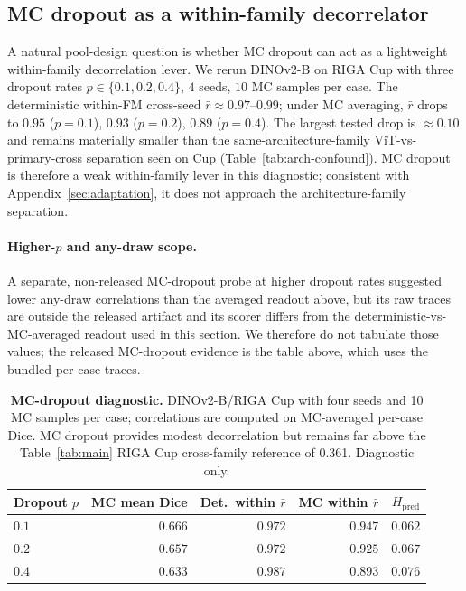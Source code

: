 \subsection{MC dropout as a within-family decorrelator}
\label{app:m22}
\label{app:mcdrop}

A natural pool-design question is whether MC dropout \citep{gal2016mcdropout} can act as a lightweight within-family decorrelation lever. We rerun DINOv2-B on RIGA Cup with three dropout rates $p\in\{0.1, 0.2, 0.4\}$, $4$ seeds, $10$ MC samples per case. The deterministic within-FM cross-seed $\bar r{\approx}0.97$--$0.99$; under MC averaging, $\bar r$ drops to $0.95$ ($p{=}0.1$), $0.93$ ($p{=}0.2$), $0.89$ ($p{=}0.4$). The largest tested drop is $\approx 0.10$ and remains materially smaller than the same-architecture-family ViT-vs-primary-cross separation seen on Cup (Table~\ref{tab:arch-confound}). MC dropout is therefore a weak within-family lever in this diagnostic; consistent with Appendix~\ref{sec:adaptation}, it does not approach the architecture-family separation.

\paragraph{Higher-$p$ and any-draw scope.} A separate, non-released MC-dropout probe at higher dropout rates suggested lower any-draw correlations than the averaged readout above, but its raw traces are outside the released artifact and its scorer differs from the deterministic-vs-MC-averaged readout used in this section. We therefore do not tabulate those values; the released MC-dropout evidence is the table above, which uses the bundled per-case traces.

\begin{table}[!htbp]
  \caption{\textbf{MC-dropout diagnostic.} DINOv2-B/RIGA Cup with four seeds and 10 MC samples per case; correlations are computed on MC-averaged per-case Dice. MC dropout provides modest decorrelation but remains far above the Table~\ref{tab:main} RIGA Cup cross-family reference of 0.361. Diagnostic only.}
  \label{tab:m22}
  \centering\small
  \begin{tabular}{lrrrr}
    \toprule
    Dropout $p$ & MC mean Dice & Det.\ within $\bar r$ & MC within $\bar r$ & $H_{\text{pred}}$ \\
    \midrule
    $0.1$ & $0.666$ & $0.972$ & $0.947$ & $0.062$ \\
    $0.2$ & $0.657$ & $0.972$ & $0.925$ & $0.067$ \\
    $0.4$ & $0.633$ & $0.987$ & $0.893$ & $0.076$ \\
    \bottomrule
  \end{tabular}
\end{table}


